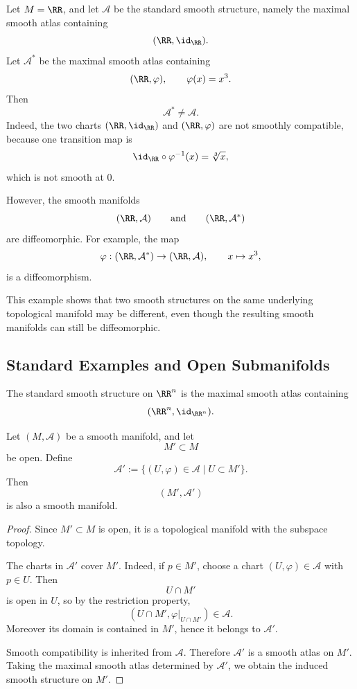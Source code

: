 \begin{example}
Let $M=\RR$, and let $\mathcal A$ be the standard smooth structure, namely the maximal smooth atlas containing
\[
  (\RR,\id_{\RR}).
\]
Let $\mathcal A^*$ be the maximal smooth atlas containing
\[
  (\RR,\varphi),
  \qquad
  \varphi(x)=x^3.
\]
Then
\[
  \mathcal A^*\neq \mathcal A.
\]
Indeed, the two charts $(\RR,\id_{\RR})$ and $(\RR,\varphi)$ are not smoothly compatible, because one transition map is
\[
  \id_{\RR}\circ\varphi^{-1}(x)=\sqrt[3]{x},
\]
which is not smooth at $0$.

However, the smooth manifolds
\[
  (\RR,\mathcal A)
  \qquad\text{and}\qquad
  (\RR,\mathcal A^*)
\]
are diffeomorphic. For example, the map
\[
  \varphi:(\RR,\mathcal A^*)\to(\RR,\mathcal A),
  \qquad
  x\mapsto x^3,
\]
is a diffeomorphism.
\end{example}

\begin{remark}
This example shows that two smooth structures on the same underlying topological manifold may be different, even though the resulting smooth manifolds can still be diffeomorphic.
\end{remark}

\subsection{Standard Examples and Open Submanifolds}

\begin{example}
The standard smooth structure on $\RR^n$ is the maximal smooth atlas containing
\[
  (\RR^n,\id_{\RR^n}).
\]
\end{example}

\begin{theorem}
Let $(M,\mathcal A)$ be a smooth manifold, and let
\[
  M'\subset M
\]
be open. Define
\[
  \mathcal A'
  :=
  \{(U,\varphi)\in\mathcal A\mid U\subset M'\}.
\]
Then
\[
  (M',\mathcal A')
\]
is also a smooth manifold.
\end{theorem}

\begin{proof}
Since $M'\subset M$ is open, it is a topological manifold with the subspace topology.

The charts in $\mathcal A'$ cover $M'$. Indeed, if $p\in M'$, choose a chart $(U,\varphi)\in\mathcal A$ with $p\in U$. Then
\[
  U\cap M'
\]
is open in $U$, so by the restriction property,
\[
  (U\cap M',\varphi|_{U\cap M'})\in\mathcal A.
\]
Moreover its domain is contained in $M'$, hence it belongs to $\mathcal A'$.

Smooth compatibility is inherited from $\mathcal A$. Therefore $\mathcal A'$ is a smooth atlas on $M'$. Taking the maximal smooth atlas determined by $\mathcal A'$, we obtain the induced smooth structure on $M'$.
\end{proof}

